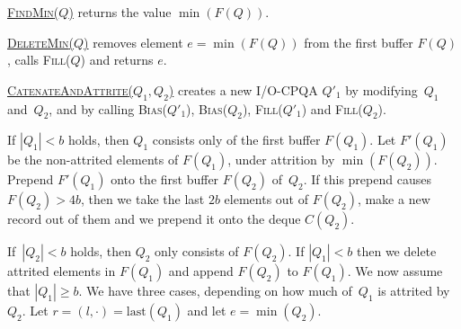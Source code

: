 \documentclass{sig-alternate}
\def\extraspacing{\vspace{2mm} \noindent}
\newcommand{\last}{\text{last}}
\renewcommand{\(}{\left(}
\renewcommand{\)}{\right)}
\begin{document}
\extraspacing \underline{\textsc{FindMin}($Q$)} returns the value $\min(F(Q))$.

\extraspacing \underline{\textsc{DeleteMin}($Q$)} removes element $e =
\min(F(Q))$ from the first buffer $F(Q)$, calls \textsc{Fill}($Q$) and returns
$e$.

\extraspacing \underline{\textsc{CatenateAndAttrite}($Q_1, Q_2$)} creates a new
I/O-CPQA $Q'_1$ by modifying~$Q_1$ and~$Q_2$, and by calling
\textsc{Bias}($Q'_1$), \textsc{Bias}($Q_2$), \textsc{Fill}($Q'_1$) and
\textsc{Fill}($Q_2$).

If $|Q_1| < b$ holds, then $Q_1$ consists only of the first buffer $F(Q_1)$.
Let $F'(Q_1)$ be the non-attrited elements of $F(Q_1)$, under attrition by
$\min(F(Q_2))$. Prepend $F'(Q_1)$ onto the first buffer $F(Q_2)$ of~$Q_2$. If
this prepend causes $F(Q_2) > 4b$, then we take the last $2b$ elements out of
$F(Q_2)$, make a new record out of them and we prepend it onto the deque
$C(Q_2)$.

If~$|Q_2| < b$ holds, then $Q_2$ only consists of $F(Q_2)$. If $|Q_1| < b$ then
we delete attrited elements in $F(Q_1)$ and append $F(Q_2)$ to $F(Q_1)$. We now
assume that $|Q_1| \geq b$. We have three cases, depending on how much of~$Q_1$
is attrited by~$Q_2$. Let $r = (l,\cdot) = \last(Q_1)$ and let $e = \min(Q_2)$.
\end{document}
